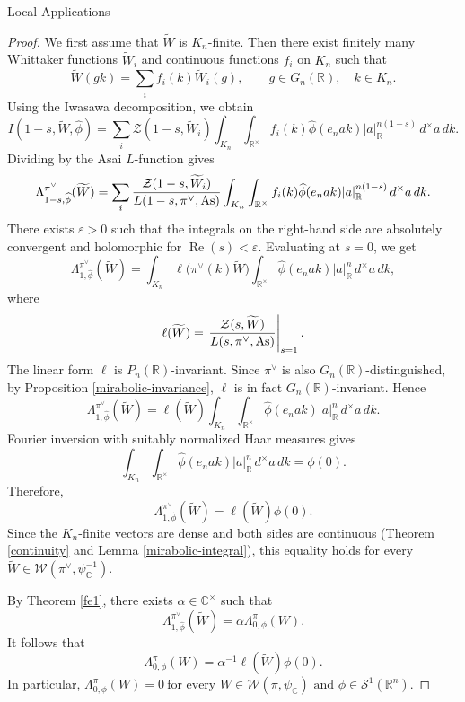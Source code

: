 \documentclass[12pt,reqno]{amsart}
\numberwithin{equation}{section}%
\numberwithin{equation}{subsection}
\theoremstyle{definition}
\theoremstyle{remark}
\begin{document}
\begin{section}{Local Applications}
\begin{proof}
We first assume that \(\widetilde{W}\) is
\(K_n\)-finite. Then there exist finitely many Whittaker functions
\(\widetilde{W}_i\) and continuous functions \(f_i\) on \(K_n\) such
that
\[
\widetilde{W}(gk)
=
\sum_i f_i(k)\widetilde{W}_i(g),
\qquad
g\in G_n(\mathbb{R}),\quad k\in K_n.
\]
Using the Iwasawa decomposition, we obtain
\[
I(1-s,\widetilde{W},\widehat{\phi})
=
\sum_i
\mathcal{Z}(1-s,\widetilde{W}_i)
\int_{K_n}\int_{\mathbb{R}^{\times}}
f_i(k)\widehat{\phi}(e_nak)
|a|_{\mathbb{R}}^{n(1-s)}
\,d^{\times}a\,dk.
\]
Dividing by the Asai \(L\)-function gives
\[
\Lambda_{1-s,\widehat{\phi}}^{{\pi}^\vee}
(\widetilde{W})
=
\sum_i
\frac{\mathcal{Z}(1-s,\widetilde{W}_i)}
     {L(1-s,{\pi}^\vee,{\rm As})}
\int_{K_n}\int_{\mathbb{R}^{\times}}
f_i(k)\widehat{\phi}(e_nak)
|a|_{\mathbb{R}}^{n(1-s)}
\,d^{\times}a\,dk.
\]
There exists \(\varepsilon>0\) such that the integrals on the
right-hand side are absolutely convergent and holomorphic for
\(\operatorname{Re}(s)<\varepsilon\). Evaluating at \(s=0\), we get
\[
\Lambda_{1,\widehat{\phi}}^{{\pi}^\vee}
(\widetilde{W})
=
\int_{K_n}
\ell\bigl({\pi}^\vee(k)\widetilde{W}\bigr)
\int_{\mathbb{R}^{\times}}
\widehat{\phi}(e_nak)|a|_{\mathbb{R}}^{n}
\,d^{\times}a\,dk,
\]
where
\[
\ell(\widetilde{W})
=
\left.
\frac{\mathcal{Z}(s,\widetilde{W})}
     {L(s,{\pi}^\vee,{\rm As})}
\right|_{s=1}.
\]
The linear form \(\ell\) is \(P_n(\mathbb{R})\)-invariant.
Since \({\pi}^\vee\) is also \(G_n(\mathbb{R})\)-distinguished,
by Proposition \ref{mirabolic-invariance}, \(\ell\) is in fact
\(G_n(\mathbb{R})\)-invariant. Hence
\[
\Lambda_{1,\widehat{\phi}}^{{\pi}^\vee}
(\widetilde{W})
=
\ell(\widetilde{W})
\int_{K_n}\int_{\mathbb{R}^{\times}}
\widehat{\phi}(e_nak)|a|_{\mathbb{R}}^{n}
\,d^{\times}a\,dk.
\]
Fourier inversion with suitably normalized Haar measures gives
\[
\int_{K_n}\int_{\mathbb{R}^{\times}}
\widehat{\phi}(e_nak)|a|_{\mathbb{R}}^{n}
\,d^{\times}a\,dk
=
\phi(0).
\]
Therefore,
\[
\Lambda_{1,\widehat{\phi}}^{{\pi}^\vee}
(\widetilde{W})
=
\ell(\widetilde{W})\phi(0).
\]
Since the \(K_n\)-finite vectors are dense and both sides are
continuous (Theorem \ref{continuity} and Lemma \ref{mirabolic-integral}), this equality holds for every
\(\widetilde{W}\in
\mathcal{W}({\pi}^\vee,\psi_{\mathbb{C}}^{-1})\).

By Theorem \ref{fe1}, there exists
\(\alpha\in\mathbb{C}^{\times}\) such that
\[
\Lambda_{1,\widehat{\phi}}^{{\pi}^\vee}
(\widetilde{W})
=
\alpha\Lambda_{0,\phi}^{\pi}(W).
\]
It follows that
\[
\Lambda_{0,\phi}^{\pi}(W)
=
\alpha^{-1}\ell(\widetilde{W})\phi(0).
\]
In particular, $
\Lambda_{0,\phi}^{\pi}(W)=0
\>
\text{for every }
W\in\mathcal{W}(\pi,\psi_{\mathbb{C}})
\text{ and }
\phi\in\mathcal{S}^{1}(\mathbb{R}^{n}).
$


\end{proof}
\end{section}
\end{document}
